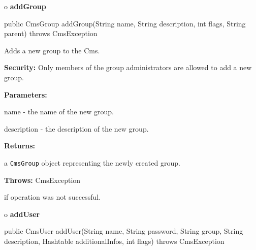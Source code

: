 o {\bf addGroup}

\begin{PRE}
 public CmsGroup addGroup(String name,
                          String description,
                          int flags,
                          String parent) throws CmsException
\end{PRE}

\begin{description}
\htmlDD Adds a new group to the Cms.

{\bf Security:} Only members of the group administrators are allowed to add a
new group.

\begin{description}
\item {\bf Parameters:}

name - the name of the new group.

description - the description of the new group.
\item {\bf Returns:}

a {\tt CmsGroup} object representing the newly created group.
\item {\bf Throws:} CmsException

if operation was not successful.
\end{description}

\end{description}

o {\bf addUser}

\begin{PRE}
 public CmsUser addUser(String name,
                        String password,
                        String group,
                        String description,
                        Hashtable additionalInfos,
                        int flags) throws CmsException
\end{PRE}

